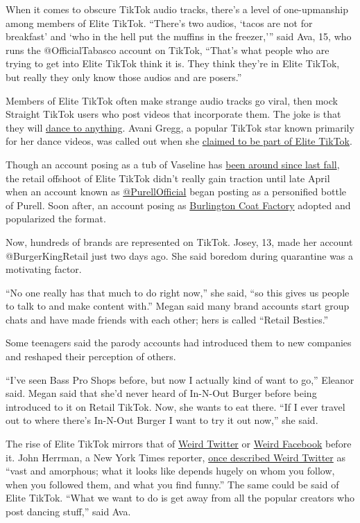When it comes to obscure TikTok audio tracks, there's a level of
one-upmanship among members of Elite TikTok. ``There's two audios,
`tacos are not for breakfast' and `who in the hell put the muffins in
the freezer,''' said Ava, 15, who runs the @OfficialTabasco account on
TikTok, ``That's what people who are trying to get into Elite TikTok
think it is. They think they're in Elite TikTok, but really they only
know those audios and are posers.''

Members of Elite TikTok often make strange audio tracks go viral, then
mock Straight TikTok users who post videos that incorporate them. The
joke is that they will
\href{https://www.youtube.com/watch?v=V6sFXjXKmtI}{dance to anything}.
Avani Gregg, a popular TikTok star known primarily for her dance videos,
was called out when she
\href{https://www.youtube.com/watch?v=-f667HSGnqo}{claimed to be part of
Elite TikTok}.

Though an account posing as a tub of Vaseline has
\href{https://www.tiktok.com/@thevaseline}{been around since last fall},
the retail offshoot of Elite TikTok didn't really gain traction until
late April when an account known as
\href{https://www.tiktok.com/@purellofficial/video/6821704984191569158}{@PurellOfficial}
began posting as a personified bottle of Purell. Soon after, an account
posing as
\href{https://www.tiktok.com/@theburlingtoncoatfactory}{Burlington Coat
Factory} adopted and popularized the format.

Now, hundreds of brands are represented on TikTok. Josey, 13, made her
account @BurgerKingRetail just two days ago. She said boredom during
quarantine was a motivating factor.

``No one really has that much to do right now,'' she said, ``so this
gives us people to talk to and make content with.'' Megan said many
brand accounts start group chats and have made friends with each other;
hers is called ``Retail Besties.''

Some teenagers said the parody accounts had introduced them to new
companies and reshaped their perception of others.

``I've seen Bass Pro Shops before, but now I actually kind of want to
go,'' Eleanor said. Megan said that she'd never heard of In-N-Out Burger
before being introduced to it on Retail TikTok. Now, she wants to eat
there. ``If I ever travel out to where there's In-N-Out Burger I want to
try it out now,'' she said.

The rise of Elite TikTok mirrors that of
\href{https://www.buzzfeednews.com/article/jwherrman/weird-twitter-the-oral-history}{Weird
Twitter} or
\href{https://nymag.com/intelligencer/2016/02/weird-facebook-became-cool-again.html}{Weird
Facebook} before it. John Herrman, a New York Times reporter,
\href{https://www.buzzfeednews.com/article/jwherrman/weird-twitter-the-oral-history}{once
described Weird Twitter} as ``vast and amorphous; what it looks like
depends hugely on whom you follow, when you followed them, and what you
find funny.'' The same could be said of Elite TikTok. ``What we want to
do is get away from all the popular creators who post dancing stuff,''
said Ava.


